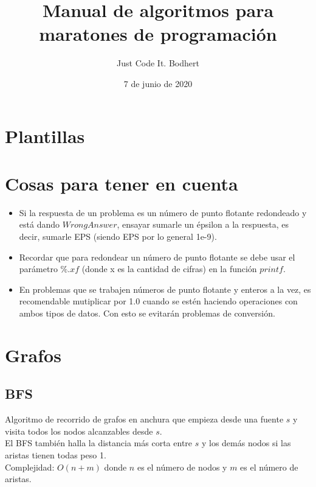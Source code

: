 \documentclass[10pt,letterpaper]{article}
\newcommand{\source}[1]{
  
  \dotfill
}
\begin{document}
\title{Manual de algoritmos para maratones de programación}
\author{Just Code It. Bodhert}
\date{7 de junio de 2020}
\maketitle

\tableofcontents

\section{Plantillas}
  \source{./src/template.cpp}
  \source{./src/template2.cpp}
 \section{Cosas para tener en cuenta}
  \begin{itemize}
    \item Si la respuesta de un problema es un número de punto flotante redondeado y está dando $Wrong Answer$, ensayar
             sumarle un épsilon a la respuesta, es decir, sumarle EPS (siendo EPS por lo general 1e-9).
    \item Recordar que para redondear un número de punto flotante se debe usar el parámetro $\%.xf$ (donde x es la cantidad de cifras)
             en la función $printf$.
    \item En problemas que se trabajen números de punto flotante y enteros a la vez, es recomendable mutiplicar por 1.0 cuando
             se estén haciendo operaciones con ambos tipos de datos. Con esto se evitarán problemas de conversión.
  \end{itemize}

\section{Grafos}

  \subsection{BFS}
    Algoritmo de recorrido de grafos en anchura que empieza desde una fuente $s$ y visita todos los nodos alcanzables desde $s$.\\
    El BFS también halla la distancia más corta entre $s$ y los demás nodos si las aristas tienen todas peso 1.\\
    Complejidad: $O(n+m)$ donde $n$ es el número de nodos y $m$ es el número de aristas.\\
    \source{./src/bfs.cpp}
\end{document}
